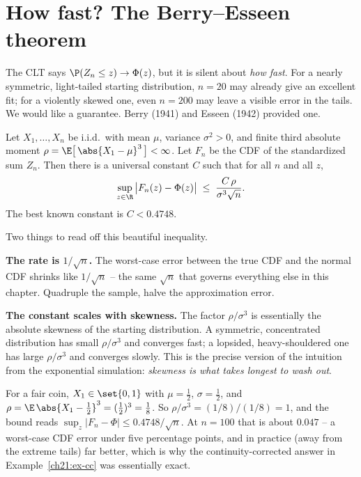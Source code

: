 \section{How fast? The Berry--Esseen theorem}
\label{ch21:berry-esseen}

The CLT says $\P(Z_n \le z) \to \Phi(z)$, but it is silent about \emph{how fast}. For a
nearly symmetric, light-tailed starting distribution, $n = 20$ may already give an
excellent fit; for a violently skewed one, even $n = 200$ may leave a visible error in
the tails. We would like a guarantee. Berry (1941) and Esseen (1942) provided one.

\begin{theorem}
\label{ch21:thm-be}
Let $X_1, \dots, X_n$ be i.i.d.\ with mean $\mu$, variance $\sigma^2 > 0$, and finite
third absolute moment $\rho = \E\big[\,\abs{X_1 - \mu}^3\,\big] < \infty$. Let $F_n$ be
the CDF of the standardized sum $Z_n$. Then there is a universal constant $C$ such that
for all $n$ and all $z$,
\[
  \sup_{z \in \R} \big| F_n(z) - \Phi(z) \big| \;\le\; \frac{C\,\rho}{\sigma^3 \sqrt n}.
\]
The best known constant is $C < 0.4748$.
\end{theorem}

Two things to read off this beautiful inequality.

\textbf{The rate is $1/\sqrt n$.} The worst-case error between the true CDF and the
normal CDF shrinks like $1/\sqrt n$ -- the same $\sqrt n$ that governs everything else
in this chapter. Quadruple the sample, halve the approximation error.

\textbf{The constant scales with skewness.} The factor $\rho/\sigma^3$ is essentially
the absolute skewness of the starting distribution. A symmetric, concentrated
distribution has small $\rho/\sigma^3$ and converges fast; a lopsided, heavy-shouldered
one has large $\rho/\sigma^3$ and converges slowly. This is the precise version of the
intuition from the exponential simulation: \emph{skewness is what takes longest to wash
out}.

\begin{example}
\label{ch21:ex-be}
For a fair coin, $X_1 \in \set{0,1}$ with $\mu = \tfrac12$, $\sigma = \tfrac12$, and
$\rho = \E\,\abs{X_1 - \tfrac12}^3 = (\tfrac12)^3 = \tfrac18$. So
$\rho/\sigma^3 = (1/8)/(1/8) = 1$, and the bound reads
$\sup_z |F_n - \Phi| \le 0.4748/\sqrt n$. At $n = 100$ that is about $0.047$ -- a
worst-case CDF error under five percentage points, and in practice (away from the
extreme tails) far better, which is why the continuity-corrected answer in
Example~\ref{ch21:ex-cc} was essentially exact.
\end{example}

